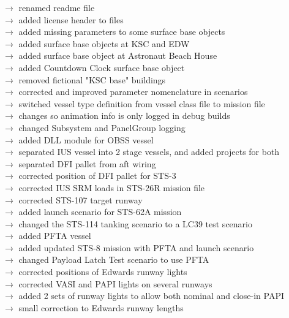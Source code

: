\documentclass[Space_Shuttle_Vessel_Manual.tex]{subfiles}
\begin{document}
$\rightarrow$ renamed readme file\\
$\rightarrow$ added license header to files\\
$\rightarrow$ added missing parameters to some surface base objects\\
$\rightarrow$ added surface base objects at KSC and EDW\\
$\rightarrow$ added surface base object at Astronaut Beach House\\
$\rightarrow$ added Countdown Clock surface base object\\
$\rightarrow$ removed fictional "KSC base" buildings\\
$\rightarrow$ corrected and improved parameter nomenclature in scenarios\\
$\rightarrow$ switched vessel type definition from vessel class file to mission file\\
$\rightarrow$ changes so animation info is only logged in debug builds\\
$\rightarrow$ changed Subsystem and PanelGroup logging\\
$\rightarrow$ added DLL module for OBSS vessel\\
$\rightarrow$ separated IUS vessel into 2 stage vessels, and added projects for both\\
$\rightarrow$ separated DFI pallet from aft wiring\\
$\rightarrow$ corrected position of DFI pallet for STS-3\\
$\rightarrow$ corrected IUS SRM loads in STS-26R mission file\\
$\rightarrow$ corrected STS-107 target runway\\
$\rightarrow$ added launch scenario for STS-62A mission\\
$\rightarrow$ changed the STS-114 tanking scenario to a LC39 test scenario\\
$\rightarrow$ added PFTA vessel\\
$\rightarrow$ added updated STS-8 mission with PFTA and launch scenario\\
$\rightarrow$ changed Payload Latch Test scenario to use PFTA\\
$\rightarrow$ corrected positions of Edwards runway lights\\
$\rightarrow$ corrected VASI and PAPI lights on several runways\\
$\rightarrow$ added 2 sets of runway lights to allow both nominal and close-in PAPI\\
$\rightarrow$ small correction to Edwards runway lengths\\
\end{document}
